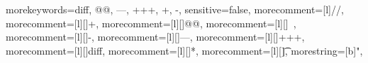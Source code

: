 %
%
% 
%
% 
%



{
    morekeywords={diff, @@, ---, +++, +, -},
    sensitive=false,
    morecomment=[l]{//},
    morecomment=[l][\color{darkgreen}]{+},
    morecomment=[l][\color{NavyBlue}]{@@},
    morecomment=[l][\color{black}]{\ },
    morecomment=[l][\color{red}]{-},
    morecomment=[l][\color{blue}]{---},
    morecomment=[l][\color{blue}]{+++},
    morecomment=[l][\color{black}]{diff},
    morecomment=[l][\color{black}]{*},
    morecomment=[l][\color{black}]{\t},
    morestring=[b]",
}
